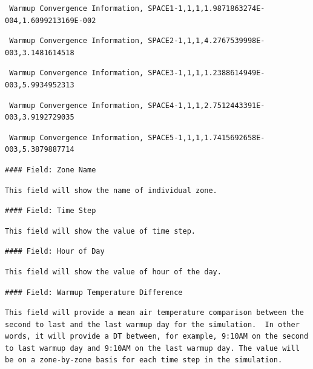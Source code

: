 \begin{lstlisting}
 Warmup Convergence Information, SPACE1-1,1,1,1.9871863274E-004,1.6099213169E-002
\end{lstlisting}

\begin{lstlisting}
 Warmup Convergence Information, SPACE2-1,1,1,4.2767539998E-003,3.1481614518
\end{lstlisting}

\begin{lstlisting}
 Warmup Convergence Information, SPACE3-1,1,1,1.2388614949E-003,5.9934952313
\end{lstlisting}

\begin{lstlisting}
 Warmup Convergence Information, SPACE4-1,1,1,2.7512443391E-003,3.9192729035
\end{lstlisting}

\begin{lstlisting}
 Warmup Convergence Information, SPACE5-1,1,1,1.7415692658E-003,5.3879887714
\end{lstlisting}

\begin{lstlisting}
#### Field: Zone Name
\end{lstlisting}

\begin{lstlisting}
This field will show the name of individual zone.
\end{lstlisting}

\begin{lstlisting}
#### Field: Time Step
\end{lstlisting}

\begin{lstlisting}
This field will show the value of time step.
\end{lstlisting}

\begin{lstlisting}
#### Field: Hour of Day
\end{lstlisting}

\begin{lstlisting}
This field will show the value of hour of the day.
\end{lstlisting}

\begin{lstlisting}
#### Field: Warmup Temperature Difference
\end{lstlisting}

\begin{lstlisting}
This field will provide a mean air temperature comparison between the second to last and the last warmup day for the simulation.  In other words, it will provide a DT between, for example, 9:10AM on the second to last warmup day and 9:10AM on the last warmup day. The value will be on a zone-by-zone basis for each time step in the simulation.
\end{lstlisting}

